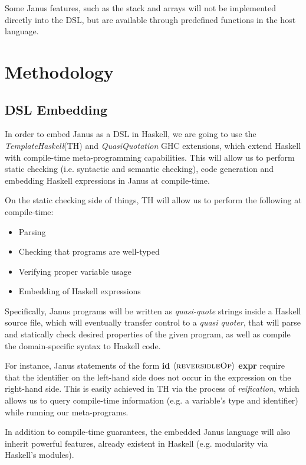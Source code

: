 \documentclass[12pt,a4paper]{article}
\begin{document}
    Some Janus features, such as the stack and arrays will not be implemented directly into the DSL, but are available through predefined functions in the host language.
\section{Methodology}
\subsection{DSL Embedding}
\label{subsec:template-haskell}
In order to embed Janus as a DSL in Haskell, we are going to use the \textit{TemplateHaskell}(TH)\cite{sheard02} and \textit{QuasiQuotation}\cite{mainland07} GHC extensions, which extend Haskell with compile-time meta-programming capabilities. This will allow us to perform static checking (i.e. syntactic and semantic checking), code generation and embedding Haskell expressions in Janus at compile-time.

On the static checking side of things, TH will allow us to perform the following at compile-time:
\begin{itemize}
    \item{Parsing}
    \item{Checking that programs are well-typed}
    \item{Verifying proper variable usage}
    \item{Embedding of Haskell expressions}
\end{itemize}

Specifically, Janus programs will be written as \textit{quasi-quote} strings inside a Haskell source file, which will eventually transfer control to a \textit{quasi quoter}, that will parse and statically check desired properties of the given program, as well as compile the domain-specific syntax to Haskell code.

For instance, Janus statements of the form \textbf{id} $\langle\textsc{reversibleOp}\rangle$ \textbf{expr} require that the identifier on the left-hand side does not occur in the expression on the right-hand side. This is easily achieved in TH via the process of \textit{reification}, which allows us to query compile-time information (e.g. a variable's type and identifier) while running our meta-programs.

In addition to compile-time guarantees, the embedded Janus language will also inherit powerful features, already existent in Haskell (e.g. modularity via Haskell's modules).
\end{document}

